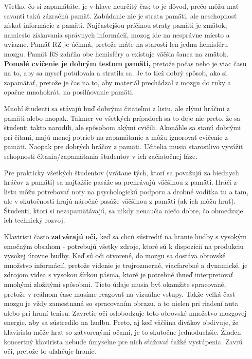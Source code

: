 \documentclass[11pt,a4paper]{book}
\begin{document}
Všetko, čo si zapamätáte, je v hlave neurčitý čas; to je dôvod, prečo môžu mať savanti takú zázračnú pamäť. Zabúdanie nie je strata pamäti, ale neschopnosť získať informácie z pamäti. Najčastejšou príčinou straty pamäti je zmätok; namiesto získavania správnych informácií, mozog ide na nesprávne miesto a uviazne. Pamäť RZ je účinná, pretože máte na starosti len jednu hemisféru mozgu. Pamäť RS zahŕňa obe hemisféry a existuje väčšia šanca na zmätok. \textbf{Pomalé cvičenie je dobrým testom pamäti,} pretože počas neho je viac času na to, aby sa myseľ potulovala a stratila sa. Je to tiež dobrý spôsob, ako si zapamätať, pretože je čas na to, aby materiál prechádzal z mozgu do ruky a opačne mnohokrát, na posilňovanie pamäti.

Mnohí študenti sa stávajú buď dobrými čitateľmi z listu, ale zlými hráčmi z pamäti alebo naopak. Takmer vo všetkých prípadoch sa to deje nie preto, že sa študenti takto narodili, ale spôsobom akými cvičili. Akonáhle sa stanú dobrými pri čítaní, majú menej potrieb na zapamätanie a môžu ignorovať cvičenie z pamäti. Naopak pre dobrých hráčov z pamäti. Učitelia musia starostlivo vyvážiť schopnosti čítania/zapamätania študentov v ich začiatočnej fáze.

Pre prakticky všetkých študentov (vrátane tých, ktorí sa považujú za biednych hráčov z pamäti) sa najťažšie pasáže sa prehrávajú väčšinou z pamäti. Hráči z listu môžu potrebovať noty na psychologickú podporu a drobné vodítka tu a tam, ale v skutočnosti hrajú náročné pasáže väčšinou z pamäti (ak ich môžu hrať). Študenti, ktorí si nezapamätávajú, sa nikdy nenaučia niečo dobre, čo obmedzuje ich technický rozvoj.

Klaviristi často \textbf{zatvárajú oči,} keď sa chcú sústrediť na hranie hudby s vysokým emočným obsahom - potrebujú všetky zdroje, ktoré sú k dispozícii na produkciu vysokej úrovne hudby. Keď sú oči otvorené, do mozgu sa dostáva obrovské množstvo informácií, pretože videnie je trojrozmerné, viacfarebné a dynamické, je zdrojom videa s vysokou šírkou pásma, ktoré je potrebné ihneď interpretovať mnohými zložitými spôsobmi. Tieto údaje musia byť okamžite spracované, pretože v reálnom čase musíme reagovať na vizuálne vstupy. Takže veľká časť mozgu je vždy zamestnaná so spracovaním obrazu, a to nielen pri riadení auta alebo pri hraní tenisu. Zavretie očí oslobodzuje toto obrovské množstvo mozgovej energie, aby sa sústredilo na hudbu. Preto, aj keď väčšina divákov obdivuje, že klavirista môže hrať so zatvorenými očami, je to skutočne jednoduchšie. Žiaden koncertný klavirista nebude úmyselne pre nich sťažovať ťažké vystúpenia. Zavrú oči, pretože to uľahčuje hranie.
\end{document}
